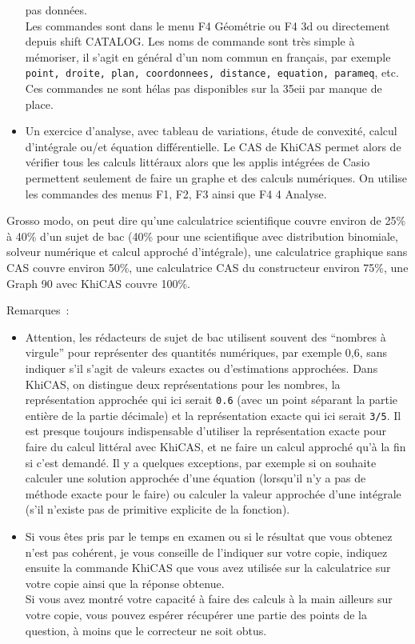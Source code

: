 \documentclass{article}
\begin{document}
\begin{giacjshere}
\begin{itemize}
pas données.\\
Les commandes sont dans le menu F4 Géométrie ou F4 3d ou directement
depuis shift CATALOG. Les noms de commande sont très simple à mémoriser,
il s'agit en général
d'un nom commun en français, par exemple {\tt point, droite,
plan, coordonnees, distance, equation, parameq}, etc.\\
Ces commandes ne sont hélas pas disponibles sur la 35eii par manque
de place.
\item Un exercice d'analyse, avec tableau de variations,
étude de convexité, calcul d'intégrale ou/et équation
différentielle. Le CAS de KhiCAS permet alors de vérifier tous les calculs
littéraux alors que les applis intégrées de Casio permettent
seulement de faire un graphe et des calculs numériques.
On utilise les commandes des menus F1, F2, F3 ainsi que F4 4 Analyse.
\end{itemize}
Grosso modo, on peut dire qu'une calculatrice scientifique couvre environ 
de 25\% à 40\% d'un sujet de bac
(40\% pour une scientifique avec distribution binomiale,
solveur numérique et calcul approché d'intégrale), 
une calculatrice graphique sans CAS couvre
environ 50\%, une calculatrice CAS du constructeur environ 75\%, une 
Graph 90 avec KhiCAS couvre 100\%.

Remarques~:
\begin{itemize}
\item
Attention, les rédacteurs de sujet de bac utilisent souvent des
``nombres à virgule'' pour représenter des quantités numériques,
par exemple 0,6, sans indiquer s'il s'agit de valeurs exactes ou
d'estimations approchées. 
Dans KhiCAS, on distingue deux représentations
pour les nombres, la représentation approchée qui ici serait
{\tt 0.6} (avec un point séparant la partie entière de la partie
décimale) et la représentation exacte qui ici serait
{\tt 3/5}. Il est presque toujours indispensable d'utiliser la représentation
exacte pour faire du calcul littéral avec KhiCAS, et ne faire un
calcul approché qu'à la fin si c'est demandé. Il y a quelques
exceptions, par exemple si on souhaite calculer une 
solution approchée d'une équation (lorsqu'il n'y a pas
de méthode exacte pour le faire) ou calculer la valeur
approchée d'une intégrale 
(s'il n'existe pas de primitive explicite de la fonction).
\item Si vous êtes pris par le temps en examen ou si le résultat que
vous obtenez n'est pas cohérent, je vous conseille de l'indiquer 
sur votre copie, indiquez ensuite
la commande KhiCAS que vous avez utilisée sur la calculatrice sur votre 
copie ainsi que la réponse obtenue.\\
Si vous avez montré votre capacité à faire des calculs 
à la main ailleurs sur votre copie, vous pouvez espérer récupérer 
une partie des points de la question, à moins que le correcteur 
ne soit obtus.
\end{itemize}


\end{giacjshere}
\end{document}
